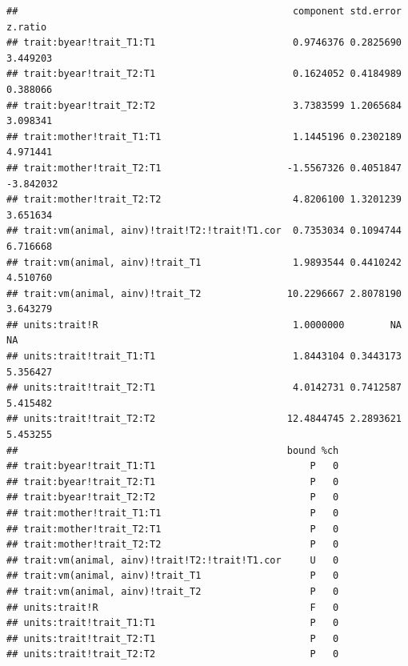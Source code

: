 \documentclass[
  12pt,
]{book}
\begin{document}
\begin{verbatim}
##                                                component std.error   z.ratio
## trait:byear!trait_T1:T1                        0.9746376 0.2825690  3.449203
## trait:byear!trait_T2:T1                        0.1624052 0.4184989  0.388066
## trait:byear!trait_T2:T2                        3.7383599 1.2065684  3.098341
## trait:mother!trait_T1:T1                       1.1445196 0.2302189  4.971441
## trait:mother!trait_T2:T1                      -1.5567326 0.4051847 -3.842032
## trait:mother!trait_T2:T2                       4.8206100 1.3201239  3.651634
## trait:vm(animal, ainv)!trait!T2:!trait!T1.cor  0.7353034 0.1094744  6.716668
## trait:vm(animal, ainv)!trait_T1                1.9893544 0.4410242  4.510760
## trait:vm(animal, ainv)!trait_T2               10.2296667 2.8078190  3.643279
## units:trait!R                                  1.0000000        NA        NA
## units:trait!trait_T1:T1                        1.8443104 0.3443173  5.356427
## units:trait!trait_T2:T1                        4.0142731 0.7412587  5.415482
## units:trait!trait_T2:T2                       12.4844745 2.2893621  5.453255
##                                               bound %ch
## trait:byear!trait_T1:T1                           P   0
## trait:byear!trait_T2:T1                           P   0
## trait:byear!trait_T2:T2                           P   0
## trait:mother!trait_T1:T1                          P   0
## trait:mother!trait_T2:T1                          P   0
## trait:mother!trait_T2:T2                          P   0
## trait:vm(animal, ainv)!trait!T2:!trait!T1.cor     U   0
## trait:vm(animal, ainv)!trait_T1                   P   0
## trait:vm(animal, ainv)!trait_T2                   P   0
## units:trait!R                                     F   0
## units:trait!trait_T1:T1                           P   0
## units:trait!trait_T2:T1                           P   0
## units:trait!trait_T2:T2                           P   0
\end{verbatim}
\end{document}
